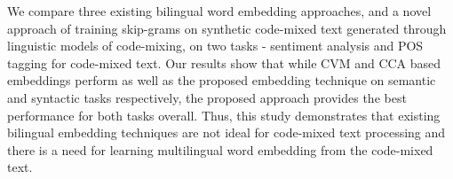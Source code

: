 We compare three existing bilingual word embedding approaches, and a novel approach of training skip-grams on synthetic code-mixed text generated through linguistic models of code-mixing, on two tasks - sentiment analysis and POS tagging for code-mixed text. Our results show that while CVM and CCA based embeddings perform as well as the proposed embedding technique on semantic and syntactic tasks respectively, the proposed approach provides the best performance for both tasks overall. Thus, this study demonstrates that existing bilingual embedding techniques are not ideal for code-mixed text processing and there is a need for learning multilingual word embedding from the code-mixed text.
